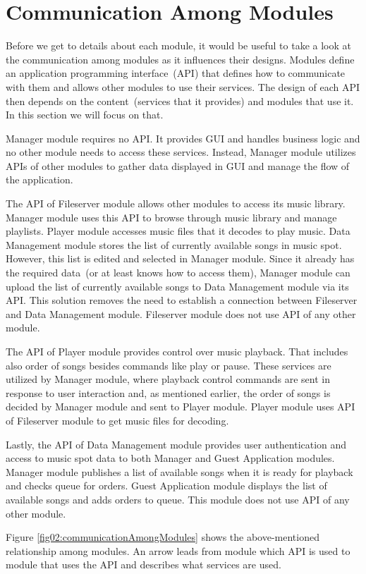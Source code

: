 \section{Communication Among Modules}
Before we get to details about each module, it would be useful to take a look at the communication among modules as it influences their designs. Modules define an application programming interface~(API) that defines how to communicate with them and allows other modules to use their services. The design of each API then depends on the content~(services that it provides) and modules that use it. In this section we will focus on that.
\par
Manager module requires no API. It provides GUI and handles business logic and no other module needs to access these services. Instead, Manager module utilizes APIs of other modules to gather data displayed in GUI and manage the flow of the application.
\par
The API of Fileserver module allows other modules to access its music library. Manager module uses this API to browse through music library and manage playlists. Player module accesses music files that it decodes to play music. Data Management module stores the list of currently available songs in music spot. However, this list is edited and selected in Manager module. Since it already has the required data~(or at least knows how to access them), Manager module can upload the list of currently available songs to Data Management module via its API. This solution removes the need to establish a connection between Fileserver and Data Management module. Fileserver module does not use API of any other module.
\par
The API of Player module provides control over music playback. That includes also order of songs besides commands like play or pause. These services are utilized by Manager module, where playback control commands are sent in response to user interaction and, as mentioned earlier, the order of songs is decided by Manager module and sent to Player module. Player module uses API of Fileserver module to get music files for decoding.
\par
Lastly, the API of Data Management module provides user authentication and access to music spot data to both Manager and Guest Application modules. Manager module publishes a list of available songs when it is ready for playback and checks queue for orders. Guest Application module displays the list of available songs and adds orders to queue. This module does not use API of any other module.
\par
Figure \ref{fig02:communicationAmongModules} shows the above-mentioned relationship among modules. An arrow leads from module which API is used to module that uses the API and describes what services are used.

